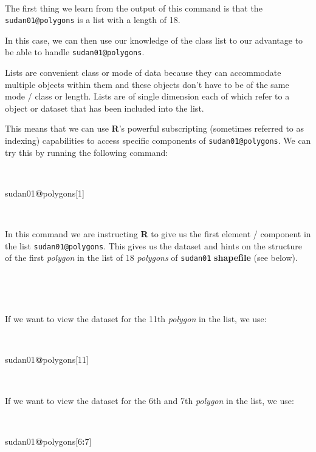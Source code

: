 \documentclass[12pt,a4paper,a4paper]{book}
\newenvironment{Shaded}{\begin{snugshade}}{\end{snugshade}}
\newcommand{\DecValTok}[1]{\textcolor[rgb]{0.00,0.00,0.81}{#1}}
\newcommand{\OperatorTok}[1]{\textcolor[rgb]{0.81,0.36,0.00}{\textbf{#1}}}
\newcommand{\NormalTok}[1]{#1}
\theoremstyle{definition}
\theoremstyle{definition}
\theoremstyle{definition}
\theoremstyle{remark}
\begin{document}
~

The first thing we learn from the output of this command is that the
\texttt{sudan01@polygons} is a list with a length of 18.

In this case, we can then use our knowledge of the class list to our
advantage to be able to handle \texttt{sudan01@polygons}.

Lists are convenient class or mode of data because they can accommodate
multiple objects within them and these objects don't have to be of the
same mode / class or length. Lists are of single dimension each of which
refer to a object or dataset that has been included into the list.

This means that we can use \textbf{R}'s powerful subscripting (sometimes
referred to as indexing) capabilities to access specific components of
\texttt{sudan01@polygons}. We can try this by running the following
command:

~

\begin{Shaded}
\begin{Highlighting}[]
\NormalTok{sudan01}\OperatorTok{@}\NormalTok{polygons[}\DecValTok{1}\NormalTok{]}
\end{Highlighting}
\end{Shaded}

~

In this command we are instructing \textbf{R} to give us the first
element / component in the list \texttt{sudan01@polygons}. This gives us
the dataset and hints on the structure of the first \emph{polygon} in
the list of 18 \emph{polygons} of \texttt{sudan01} \textbf{shapefile}
(see below).

~

~

If we want to view the dataset for the 11th \emph{polygon} in the list,
we use:

~

\begin{Shaded}
\begin{Highlighting}[]
\NormalTok{sudan01}\OperatorTok{@}\NormalTok{polygons[}\DecValTok{11}\NormalTok{]}
\end{Highlighting}
\end{Shaded}

~

If we want to view the dataset for the 6th and 7th \emph{polygon} in the
list, we use:

~

\begin{Shaded}
\begin{Highlighting}[]
\NormalTok{sudan01}\OperatorTok{@}\NormalTok{polygons[}\DecValTok{6}\OperatorTok{:}\DecValTok{7}\NormalTok{]}
\end{Highlighting}
\end{Shaded}
\end{document}
